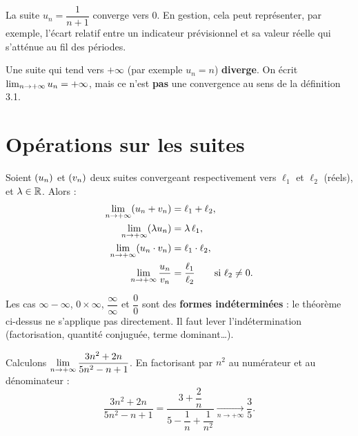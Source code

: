 \documentclass[12pt,a4paper]{article}
\begin{document}
\begin{exemplebox}[3.1]
La suite $u_n = \dfrac{1}{n+1}$ converge vers $0$. En gestion, cela peut représenter, par exemple, l'écart relatif entre un indicateur prévisionnel et sa valeur réelle qui s'atténue au fil des périodes.
\end{exemplebox}

\begin{attentionbox}
Une suite qui tend vers $+\infty$ (par exemple $u_n = n$) \textbf{diverge}. On écrit $\lim_{n\to +\infty} u_n = +\infty$, mais ce n'est \textbf{pas} une convergence au sens de la définition 3.1.
\end{attentionbox}

\section{Opérations sur les suites}

\begin{theoremebox}
Soient $(u_n)$ et $(v_n)$ deux suites convergeant respectivement vers $\ell_1$ et $\ell_2$ (réels), et $\lambda\in\mathbb{R}$. Alors :
\begin{align*}
\lim_{n\to +\infty} (u_n + v_n) &= \ell_1 + \ell_2, \\
\lim_{n\to +\infty} (\lambda u_n) &= \lambda\,\ell_1, \\
\lim_{n\to +\infty} (u_n \cdot v_n) &= \ell_1 \cdot \ell_2, \\
\lim_{n\to +\infty} \dfrac{u_n}{v_n} &= \dfrac{\ell_1}{\ell_2} \qquad \text{si }\ell_2 \neq 0.
\end{align*}
\end{theoremebox}

\begin{attentionbox}
Les cas $\infty-\infty$, $0\times\infty$, $\dfrac{\infty}{\infty}$ et $\dfrac{0}{0}$ sont des \textbf{formes indéterminées} : le théorème ci-dessus ne s'applique pas directement. Il faut lever l'indétermination (factorisation, quantité conjuguée, terme dominant\ldots).
\end{attentionbox}

\begin{exemplebox}
Calculons $\displaystyle\lim_{n\to +\infty} \dfrac{3n^2+2n}{5n^2-n+1}$. En factorisant par $n^2$ au numérateur et au dénominateur :
\[
\dfrac{3n^2+2n}{5n^2-n+1}
= \dfrac{3 + \dfrac{2}{n}}{5 - \dfrac{1}{n} + \dfrac{1}{n^2}}
\xrightarrow[n\to+\infty]{} \dfrac{3}{5}.
\]
\end{exemplebox}
\end{document}
